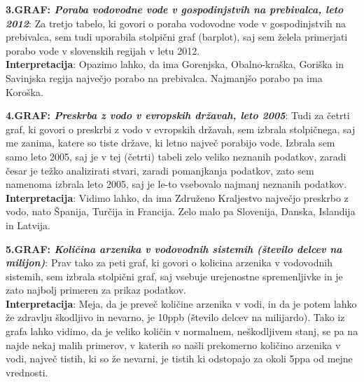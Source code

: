 \documentclass[11pt,a4paper]{article}
\begin{document}

\newpage
\textbf{3.GRAF: \emph{Poraba vodovodne vode v gospodinjstvih na prebivalca, leto 2012}}: Za tretjo tabelo, ki govori o poraba vodovodne vode v gospodinjstvih na prebivalca, sem tudi uporabila stolpični graf (barplot), saj sem želela primerjati porabo vode v slovenskih regijah v letu 2012. \\
\textbf{Interpretacija}: Opazimo lahko, da ima Gorenjska, Obalno-kraška, Goriška in Savinjska regija največjo porabo na prebivalca. Najmanjšo porabo pa ima Koroška.\\


\newpage
\textbf{4.GRAF: \emph{Preskrba z vodo v evropskih državah, leto 2005}}: Tudi za četrti graf, ki govori o preskrbi z vodo v evropskih državah, sem izbrala stolpičnega, saj me zanima, katere so tiste države, ki letno največ porabijo vode. Izbrala sem samo leto 2005, saj je v tej (četrti) tabeli zelo veliko neznanih podatkov, zaradi česar je težko analizirati stvari, zaradi pomanjkanja podatkov, zato sem namenoma izbrala leto 2005, saj je le-to vsebovalo najmanj neznanih podatkov.\\
\textbf{Interpretacija}: Vidimo lahko, da ima Združeno Kraljestvo največjo preskrbo z vodo, nato Španija, Turčija in Francija. Zelo malo pa Slovenija, Danska, Islandija in Latvija.\\


\newpage
\textbf{5.GRAF: \emph{Količina arzenika v vodovodnih sistemih (število delcev na milijon)}}: Prav tako za peti graf, ki govori o kolicina arzenika v vodovodnih sistemih, sem izbrala stolpični graf, saj vsebuje urejenostne spremenljivke in je zato najbolj primeren za prikaz podatkov.\\
\textbf{Interpretacija}: Meja, da je preveč količine arzenika v vodi, in da je potem lahko že zdravlju škodljivo in nevarno, je 10ppb (število delcev na milijardo). Tako iz grafa lahko vidimo, da je veliko količin v normalnem, neškodljivem stanj, se pa na najde nekaj malih primerov, v katerih so našli prekomerno količino arzenika v vodi, največ tistih, ki so že nevarni, je tistih ki odstopajo za okoli 5ppa od mejne vrednosti.\\
\end{document}
